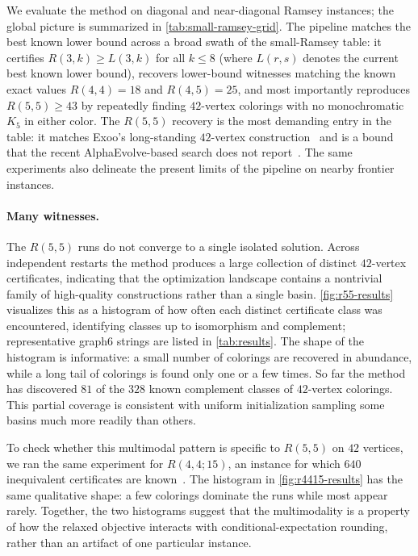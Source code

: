 \documentclass{article}
\begin{document}
We evaluate the method on diagonal and near-diagonal Ramsey instances; the global picture is summarized in \cref{tab:small-ramsey-grid}. The pipeline matches the best known lower bound across a broad swath of the small-Ramsey table: it certifies $R(3,k) \geq L(3,k)$ for all $k \leq 8$ (where $L(r,s)$ denotes the current best known lower bound), recovers lower-bound witnesses matching the known exact values $R(4,4) = 18$ and $R(4,5) = 25$, and most importantly reproduces $R(5,5) \geq 43$ by repeatedly finding $42$-vertex colorings with no monochromatic $K_5$ in either color. The $R(5,5)$ recovery is the most demanding entry in the table: it matches Exoo's long-standing $42$-vertex construction~\cite{exoo1989lower} and is a bound that the recent AlphaEvolve-based search does not report~\cite{nagda2026reinforcedgenerationcombinatorialstructures}. The same experiments also delineate the present limits of the pipeline on nearby frontier instances.

\paragraph{Many witnesses.}
The $R(5,5)$ runs do not converge to a single isolated solution. Across independent restarts the method produces a large collection of distinct $42$-vertex certificates, indicating that the optimization landscape contains a nontrivial family of high-quality constructions rather than a single basin. \cref{fig:r55-results} visualizes this as a histogram of how often each distinct certificate class was encountered, identifying classes up to isomorphism and complement; representative graph6 strings are listed in \cref{tab:results}. The shape of the histogram is informative: a small number of colorings are recovered in abundance, while a long tail of colorings is found only one or a few times. So far the method has discovered $81$ of the $328$ known complement classes of $42$-vertex colorings. This partial coverage is consistent with uniform initialization sampling some basins much more readily than others.

To check whether this multimodal pattern is specific to $R(5,5)$ on $42$ vertices, we ran the same experiment for $R(4,4;15)$, an instance for which $640$ inequivalent certificates are known~\cite{mckayramseydata}. The histogram in \cref{fig:r4415-results} has the same qualitative shape: a few colorings dominate the runs while most appear rarely. Together, the two histograms suggest that the multimodality is a property of how the relaxed objective interacts with conditional-expectation rounding, rather than an artifact of one particular instance.
\end{document}
